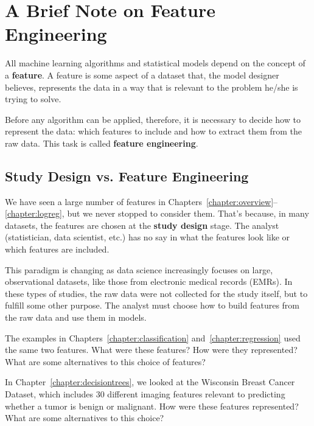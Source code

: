\chapter{A Brief Note on Feature Engineering \label{chapter:feateng}}

All machine learning algorithms and statistical models depend on the concept of a \textbf{feature}. A feature is some aspect of a dataset that, the model designer believes, represents the data in a way that is relevant to the problem he/she is trying to solve. 

Before any algorithm can be applied, therefore, it is necessary to decide how to represent the data: which features to include and how to extract them from the raw data. This task is called \textbf{feature engineering}.


\section{Study Design vs. Feature Engineering}

We have seen a large number of features in Chapters~\ref{chapter:overview}--\ref{chapter:logreg}, but we never stopped to consider them. That's because, in many datasets, the features are chosen at the \textbf{study design} stage. The analyst (statistician, data scientist, etc.) has no say in what the features look like or which features are included.

This paradigm is changing as data science increasingly focuses on large, observational datasets, like those from electronic medical records (EMRs). In these types of studies, the raw data were not collected for the study itself, but to fulfill some other purpose. The analyst must choose how to build features from the raw data and use them in models.
\vspace{4mm}

\begin{question}{}
The examples in Chapters~\ref{chapter:classification} and~\ref{chapter:regression} used the same two features. What were these features? How were they represented? What are some alternatives to this choice of features?
\end{question}

\begin{question}{}
In Chapter~\ref{chapter:decisiontrees}, we looked at the Wisconsin Breast Cancer Dataset, which includes $30$ different imaging features relevant to predicting whether a tumor is benign or malignant. How were these features represented? What are some alternatives to this choice?
\end{question}


